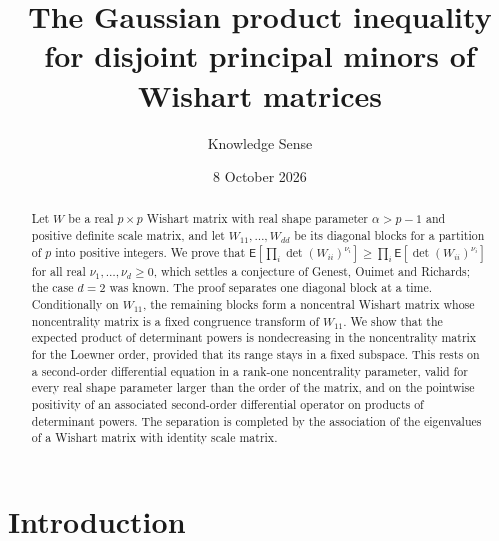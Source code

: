 \documentclass{amsart}
\theoremstyle{definition}
\theoremstyle{remark}
\numberwithin{equation}{section}
\newcommand{\E}{\mathsf{E}}
\begin{document}
\title[Wishart product inequality]{The Gaussian product inequality for disjoint principal minors of Wishart matrices}

\author{Knowledge Sense}
\address{Knowledge Sense}

\date{8 October 2026}



\begin{abstract}
Let $W$ be a real $p\times p$ Wishart matrix with real shape parameter $\alpha>p-1$ and positive definite scale matrix, and let $W_{11},\dots,W_{dd}$ be its diagonal blocks for a partition of $p$ into positive integers. We prove that $\E[\prod_i\det(W_{ii})^{\nu_i}]\ge\prod_i\E[\det(W_{ii})^{\nu_i}]$ for all real $\nu_1,\dots,\nu_d\ge0$, which settles a conjecture of Genest, Ouimet and Richards; the case $d=2$ was known. The proof separates one diagonal block at a time. Conditionally on $W_{11}$, the remaining blocks form a noncentral Wishart matrix whose noncentrality matrix is a fixed congruence transform of $W_{11}$. We show that the expected product of determinant powers is nondecreasing in the noncentrality matrix for the Loewner order, provided that its range stays in a fixed subspace. This rests on a second-order differential equation in a rank-one noncentrality parameter, valid for every real shape parameter larger than the order of the matrix, and on the pointwise positivity of an associated second-order differential operator on products of determinant powers. The separation is completed by the association of the eigenvalues of a Wishart matrix with identity scale matrix.
\end{abstract}

\maketitle

\section{Introduction}
\end{document}
